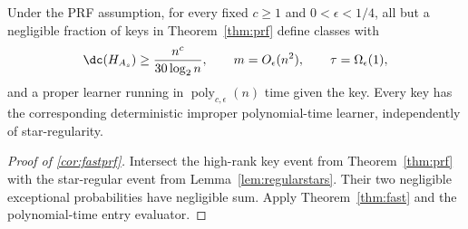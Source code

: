 \begin{corollary}\label{cor:fastprf}
Under the PRF assumption, for every fixed $c\ge1$ and $0<\epsilon<1/4$, all but a negligible fraction of keys in Theorem~\ref{thm:prf} define classes with
\[
 \dc(H_{A_s})\ge\frac{n^c}{30\log_2n},\qquad
 m=O_\epsilon(n^2),\qquad\tau=\Omega_\epsilon(1),
\]
and a proper learner running in $\operatorname{poly}_{c,\epsilon}(n)$ time given the key. Every key has the corresponding deterministic improper polynomial-time learner, independently of star-regularity.
\end{corollary}

\begin{proof}[Proof of \cref{cor:fastprf}]
Intersect the high-rank key event from Theorem~\ref{thm:prf} with the star-regular event from Lemma~\ref{lem:regularstars}. Their two negligible exceptional probabilities have negligible sum. Apply Theorem~\ref{thm:fast} and the polynomial-time entry evaluator.
\end{proof}
